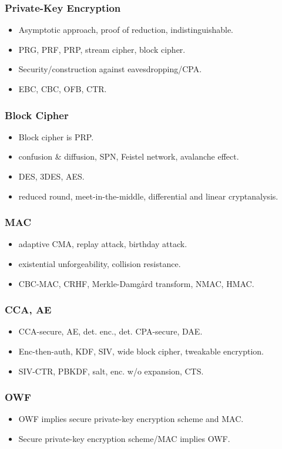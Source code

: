\begin{frame}\frametitle{Private-Key Encryption}
\begin{itemize}
\item Asymptotic approach, proof of reduction, indistinguishable.
\item PRG, PRF, PRP, stream cipher, block cipher.
\item Security/construction against eavesdropping/CPA.
\item EBC, CBC, OFB, CTR.
\end{itemize}
\end{frame}
\begin{frame}\frametitle{Block Cipher}
\begin{itemize}
\item Block cipher is PRP.
\item confusion \& diffusion, SPN, Feistel network, avalanche effect.
\item DES, 3DES, AES.
\item reduced round, meet-in-the-middle, differential and linear cryptanalysis. 
\end{itemize}
\end{frame}
\begin{frame}\frametitle{MAC}
\begin{itemize}
\item adaptive CMA, replay attack, birthday attack.
\item existential unforgeability, collision resistance.
\item CBC-MAC, CRHF, Merkle-Damg\r{a}rd transform, NMAC, HMAC. 
\end{itemize}
\end{frame}
\begin{frame}\frametitle{CCA, AE}
\begin{itemize}
\item CCA-secure, AE, det. enc., det. CPA-secure, DAE.
\item Enc-then-auth, KDF, SIV, wide block cipher, tweakable encryption.
\item SIV-CTR, PBKDF, salt, enc. w/o expansion, CTS.
\end{itemize}
\end{frame}
\begin{frame}\frametitle{OWF}
\begin{itemize}
\item OWF implies secure private-key encryption scheme and MAC.
\item Secure private-key encryption scheme/MAC implies OWF.
\end{itemize}
\end{frame}
